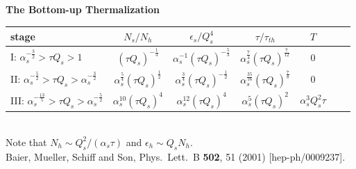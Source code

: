 \documentclass[9pt,a4paper,unknownkeysallowed,xcolor=dvipsnames,aspectratio=43]{beamer}
\begin{document}
\begin{frame}{\bf\huge The Bottom-up Thermalization}
\begin{center}
\begin{tabular}{ l|| c c c c c c}
\hline
stage&$N_s/N_h$ & $\epsilon_s/Q_s^4$ & $\tau/\tau_{th}$ & $T$\\
\hline\hline
 I: $\alpha_s^{-\frac{3}{2}}> \tau Q_s > 1$ 
 & $(\tau Q_s)^{-\frac{1}{3}}$ 
 & $\alpha_{s}^{-1} (\tau Q_s)^{-\frac{5}{3}}$
 & $\alpha_{s}^{\frac{7}{4}} (\tau Q_s)^{\frac{7}{12}}$
 &0\\
 \hline
 II: $\alpha_s^{-\frac{5}{2}}> \tau Q_s > \alpha_s^{-\frac{3}{2}}$ 
 & $\alpha_{s}^{\frac{5}{4}} (\tau Q_s)^{\frac{1}{2}}$
 & $\alpha_{s}^{\frac{3}{4}}(\tau Q_s)^{-\frac{1}{2}}$
 & $\alpha_{s}^{\frac{35}{16}} (\tau Q_s)^{\frac{7}{8}}$
 &0\\
  \hline
 III: $\alpha_s^{-\frac{13}{5}}> \tau Q_s > \alpha_s^{-\frac{5}{2}}$ 
 & $\alpha_{s}^{10} (\tau Q_s)^{4}$
 & $\alpha_{s}^{12} (\tau Q_s)^{4}$ 
 & $ \alpha_{s}^{5} (\tau Q_s)^{2}$
 & $ \alpha_{s}^{3} Q_{s}^{2} \tau$\\
 \hline
\end{tabular}\\
\vspace{2mm}
{\small Note that $N_h \sim Q_s^2/(\alpha_s\tau)$ and $\epsilon_h\sim Q_s N_h$.}\\
\vspace{2mm}
    {\tiny  {\color{teablue}
  Baier, Mueller, Schiff and Son,
  Phys.\ Lett.\ B {\bf 502}, 51 (2001)
  [hep-ph/0009237].
}}
\end{center}
\end{frame}
%
%
\end{document}
